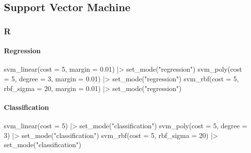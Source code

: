 \documentclass[
  letterpaper,
  DIV=11,
  numbers=noendperiod]{scrreprt}
\newenvironment{Shaded}{\begin{snugshade}}{\end{snugshade}}
\newcommand{\AttributeTok}[1]{\textcolor[rgb]{0.40,0.46,0.14}{#1}}
\newcommand{\DecValTok}[1]{\textcolor[rgb]{0.68,0.00,0.00}{#1}}
\newcommand{\FloatTok}[1]{\textcolor[rgb]{0.68,0.00,0.00}{#1}}
\newcommand{\FunctionTok}[1]{\textcolor[rgb]{0.28,0.35,0.67}{#1}}
\newcommand{\NormalTok}[1]{\textcolor[rgb]{0.00,0.46,0.62}{#1}}
\newcommand{\SpecialCharTok}[1]{\textcolor[rgb]{0.37,0.37,0.37}{#1}}
\newcommand{\StringTok}[1]{\textcolor[rgb]{0.13,0.47,0.30}{#1}}
\let\oldparagraph\paragraph
\renewcommand{\paragraph}[1]{\oldparagraph{#1}\mbox{}}
\begin{document}
\hypertarget{support-vector-machine}{%
\subsection{Support Vector Machine}\label{support-vector-machine}}

\hypertarget{r-75}{%
\subsubsection{R}\label{r-75}}

\hypertarget{regression-4}{%
\paragraph{Regression}\label{regression-4}}

\begin{Shaded}
\begin{Highlighting}[]
\FunctionTok{svm\_linear}\NormalTok{(}\AttributeTok{cost =} \DecValTok{5}\NormalTok{, }\AttributeTok{margin =} \FloatTok{0.01}\NormalTok{) }\SpecialCharTok{|\textgreater{}} \FunctionTok{set\_mode}\NormalTok{(}\StringTok{"regression"}\NormalTok{)}
\FunctionTok{svm\_poly}\NormalTok{(}\AttributeTok{cost =} \DecValTok{5}\NormalTok{, }\AttributeTok{degree =} \DecValTok{3}\NormalTok{, }\AttributeTok{margin =} \FloatTok{0.01}\NormalTok{) }\SpecialCharTok{|\textgreater{}} \FunctionTok{set\_mode}\NormalTok{(}\StringTok{"regression"}\NormalTok{)}
\FunctionTok{svm\_rbf}\NormalTok{(}\AttributeTok{cost =} \DecValTok{5}\NormalTok{, }\AttributeTok{rbf\_sigma =} \DecValTok{20}\NormalTok{, }\AttributeTok{margin =} \FloatTok{0.01}\NormalTok{) }\SpecialCharTok{|\textgreater{}} \FunctionTok{set\_mode}\NormalTok{(}\StringTok{"regression"}\NormalTok{)}
\end{Highlighting}
\end{Shaded}

\hypertarget{classification-4}{%
\paragraph{Classification}\label{classification-4}}

\begin{Shaded}
\begin{Highlighting}[]
\FunctionTok{svm\_linear}\NormalTok{(}\AttributeTok{cost =} \DecValTok{5}\NormalTok{) }\SpecialCharTok{|\textgreater{}} \FunctionTok{set\_mode}\NormalTok{(}\StringTok{"classification"}\NormalTok{)}
\FunctionTok{svm\_poly}\NormalTok{(}\AttributeTok{cost =} \DecValTok{5}\NormalTok{, }\AttributeTok{degree =} \DecValTok{3}\NormalTok{) }\SpecialCharTok{|\textgreater{}} \FunctionTok{set\_mode}\NormalTok{(}\StringTok{"classification"}\NormalTok{)}
\FunctionTok{svm\_rbf}\NormalTok{(}\AttributeTok{cost =} \DecValTok{5}\NormalTok{, }\AttributeTok{rbf\_sigma =} \DecValTok{20}\NormalTok{) }\SpecialCharTok{|\textgreater{}} \FunctionTok{set\_mode}\NormalTok{(}\StringTok{"classification"}\NormalTok{)}
\end{Highlighting}
\end{Shaded}
\end{document}
